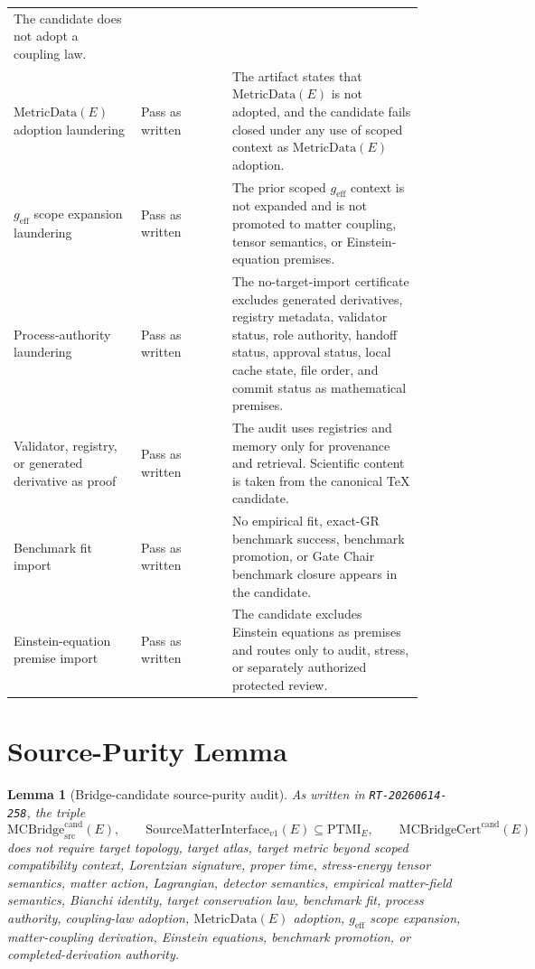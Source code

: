 \documentclass[11pt]{article}
\newcommand{\MetricData}{\mathrm{MetricData}}
\newcommand{\geff}{g_{\mathrm{eff}}}
\newcommand{\MCBridgeCand}{\mathrm{MCBridge}_{\mathrm{src}}^{\mathrm{cand}}}
\newcommand{\MCBridgeCertCand}{\mathrm{MCBridgeCert}^{\mathrm{cand}}}
\newcommand{\SMI}{\mathrm{SourceMatterInterface}_{v1}}
\newcommand{\PTMI}{\mathrm{PTMI}}
\newtheorem{lemma}{Lemma}
\begin{document}
\begin{longtable}{p{0.28\linewidth}p{0.20\linewidth}p{0.42\linewidth}}
The candidate does not adopt a coupling law. \\
\addlinespace
\(\MetricData(E)\) adoption laundering &
Pass as written &
The artifact states that \(\MetricData(E)\) is not adopted, and the candidate
fails closed under any use of scoped context as \(\MetricData(E)\) adoption. \\
\addlinespace
\(\geff\) scope expansion laundering &
Pass as written &
The prior scoped \(\geff\) context is not expanded and is not promoted to
matter coupling, tensor semantics, or Einstein-equation premises. \\
\addlinespace
Process-authority laundering &
Pass as written &
The no-target-import certificate excludes generated derivatives, registry
metadata, validator status, role authority, handoff status, approval status,
local cache state, file order, and commit status as mathematical premises. \\
\addlinespace
Validator, registry, or generated derivative as proof &
Pass as written &
The audit uses registries and memory only for provenance and retrieval.
Scientific content is taken from the canonical TeX candidate. \\
\addlinespace
Benchmark fit import &
Pass as written &
No empirical fit, exact-GR benchmark success, benchmark promotion, or Gate
Chair benchmark closure appears in the candidate. \\
\addlinespace
Einstein-equation premise import &
Pass as written &
The candidate excludes Einstein equations as premises and routes only to
audit, stress, or separately authorized protected review. \\
\bottomrule
\end{longtable}

\section{Source-Purity Lemma}

\begin{lemma}[Bridge-candidate source-purity audit]
As written in \texttt{RT-20260614-258}, the triple
\[
  \MCBridgeCand(E),\qquad
  \SMI(E)\subseteq\PTMI_E,\qquad
  \MCBridgeCertCand(E)
\]
does not require target topology, target atlas, target metric beyond scoped
compatibility context, Lorentzian signature, proper time, stress-energy
tensor semantics, matter action, Lagrangian, detector semantics, empirical
matter-field semantics, Bianchi identity, target conservation law,
benchmark fit, process authority, coupling-law adoption, \(\MetricData(E)\)
adoption, \(\geff\) scope expansion, matter-coupling derivation, Einstein
equations, benchmark promotion, or completed-derivation authority.
\end{lemma}
\end{document}
